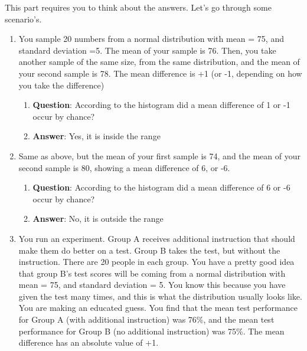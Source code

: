 \documentclass[
]{book}
\providecommand{\tightlist}{%
  \setlength{\itemsep}{0pt}\setlength{\parskip}{0pt}}
\begin{document}
This part requires you to think about the answers. Let's go through some scenario's.

\begin{enumerate}
\def\labelenumi{\arabic{enumi}.}
\item
  You sample 20 numbers from a normal distribution with mean = 75, and standard deviation =5. The mean of your sample is 76. Then, you take another sample of the same size, from the same distribution, and the mean of your second sample is 78. The mean difference is +1 (or -1, depending on how you take the difference)

  \begin{enumerate}
  \def\labelenumii{\alph{enumii}.}
  \tightlist
  \item
    \textbf{Question}: According to the histogram did a mean difference of 1 or -1 occur by chance?
  \item
    \textbf{Answer}: Yes, it is inside the range
  \end{enumerate}
\item
  Same as above, but the mean of your first sample is 74, and the mean of your second sample is 80, showing a mean difference of 6, or -6.

  \begin{enumerate}
  \def\labelenumii{\alph{enumii}.}
  \tightlist
  \item
    \textbf{Question}: According to the histogram did a mean difference of 6 or -6 occur by chance?
  \item
    \textbf{Answer}: No, it is outside the range
  \end{enumerate}
\item
  You run an experiment. Group A receives additional instruction that should make them do better on a test. Group B takes the test, but without the instruction. There are 20 people in each group. You have a pretty good idea that group B's test scores will be coming from a normal distribution with mean = 75, and standard deviation = 5. You know this because you have given the test many times, and this is what the distribution usually looks like. You are making an educated guess. You find that the mean test performance for Group A (with additional instruction) was 76\%, and the mean test performance for Group B (no additional instruction) was 75\%. The mean difference has an absolute value of +1.


\end{enumerate}
\end{document}
